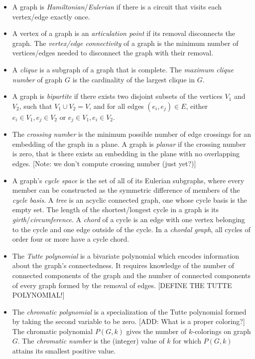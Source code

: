 \documentclass[12pt]{article}
\begin{document}
\begin{itemize}
\item A graph is \textit{Hamiltonian}/\textit{Eulerian} if there is a circuit that visits each vertex/edge exactly once.

\item A vertex of a graph is an \textit{articulation point} if its removal disconnects the graph. 
The \textit{vertex/edge connectivity} of a graph is the minimum number of vertices/edges needed to disconnect the graph with their removal. 

\item A \textit{clique} is a subgraph of a graph that is complete. The \textit{maximum clique number} of graph $G$ is the cardinality of the largest clique in $G$. 

\item A graph is \textit{bipartite} if there exists two disjoint subsets of the vertices $V_1$ and $V_2$, such that $V_1 \cup V_2 = V$, and for all edges $(e_i,e_j) \in E$,  either $e_i \in V_1, e_j \in V_2$ or $e_j \in V_1, e_i \in V_2$. 

\item The \textit{crossing number} is the minimum possible number of edge crossings for an embedding of the graph in a plane.
A graph is \textit{planar} if the crossing number is zero, that is there exists an embedding in the plane with no overlapping edges.
[Note: we don't compute crossing number (just yet?)]

\item A graph's \textit{cycle space} is the set of all of its Eulerian subgraphs, where every member can be constructed as the symmetric difference of members of the \textit{cycle basis}. 
A \textit{tree} is an acyclic connected graph, one whose cycle basis is the empty set.
The length of the shortest/longest cycle in a graph is its \textit{girth}/\textit{circumference}.
A \textit{chord} of a cycle is an edge with one vertex belonging to the cycle and one edge outside of the cycle.
In a \textit{chordal graph}, all cycles of order four or more have a cycle chord.   
 
\item The \textit{Tutte polynomial} is a bivariate polynomial which encodes information about the graph's connectedness. 
It requires knowledge of the number of connected components of the graph and the number of connected components of every graph formed by the removal of edges. 
[DEFINE THE TUTTE POLYNOMIAL!]

\item The \textit{chromatic polynomial} is a specialization of the Tutte polynomial formed by taking the second variable to be zero. 
[ADD: What is a proper coloring?]
The chromatic polynomial $P(G,k)$ gives the number of $k$-colorings on graph $G$. 
The \textit{chromatic number} is the (integer) value of $k$ for which $P(G,k)$ attains its smallest positive value. 


\end{itemize}
\end{document}
